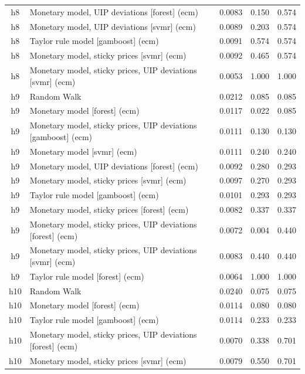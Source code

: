 \begin{ThreePartTable}
\begin{longtable}[t]{cp{5.5cm}ccc}
h8 & \raggedright Monetary model, UIP deviations [forest] (ecm) & 0.0083 & 0.150 & 0.574\\
h8 & \raggedright Monetary model, UIP deviations [svmr] (ecm) & 0.0089 & 0.203 & 0.574\\
h8 & \raggedright Taylor rule model [gamboost] (ecm) & 0.0091 & 0.574 & 0.574\\
h8 & \raggedright Monetary model, sticky prices [svmr] (ecm) & 0.0092 & 0.465 & 0.574\\
h8 & \raggedright Monetary model, sticky prices, UIP deviations [svmr] (ecm) & 0.0053 & 1.000 & 1.000\\
\addlinespace
h9 & \raggedright Random Walk & 0.0212 & 0.085 & 0.085\\
h9 & \raggedright Monetary model [forest] (ecm) & 0.0117 & 0.022 & 0.085\\
h9 & \raggedright Monetary model, sticky prices, UIP deviations [gamboost] (ecm) & 0.0111 & 0.130 & 0.130\\
h9 & \raggedright Monetary model [svmr] (ecm) & 0.0111 & 0.240 & 0.240\\
h9 & \raggedright Monetary model, UIP deviations [forest] (ecm) & 0.0092 & 0.280 & 0.293\\
h9 & \raggedright Monetary model, sticky prices [svmr] (ecm) & 0.0097 & 0.270 & 0.293\\
h9 & \raggedright Taylor rule model [gamboost] (ecm) & 0.0101 & 0.293 & 0.293\\
h9 & \raggedright Monetary model, sticky prices [forest] (ecm) & 0.0082 & 0.337 & 0.337\\
h9 & \raggedright Monetary model, sticky prices, UIP deviations [forest] (ecm) & 0.0072 & 0.004 & 0.440\\
h9 & \raggedright Monetary model, sticky prices, UIP deviations [svmr] (ecm) & 0.0083 & 0.440 & 0.440\\
h9 & \raggedright Taylor rule model [forest] (ecm) & 0.0064 & 1.000 & 1.000\\
\addlinespace
h10 & \raggedright Random Walk & 0.0240 & 0.075 & 0.075\\
h10 & \raggedright Monetary model [forest] (ecm) & 0.0114 & 0.080 & 0.080\\
h10 & \raggedright Taylor rule model [gamboost] (ecm) & 0.0114 & 0.233 & 0.233\\
h10 & \raggedright Monetary model, sticky prices, UIP deviations [forest] (ecm) & 0.0070 & 0.338 & 0.701\\
h10 & \raggedright Monetary model, sticky prices [svmr] (ecm) & 0.0079 & 0.550 & 0.701\\

\end{longtable}
\end{ThreePartTable}
